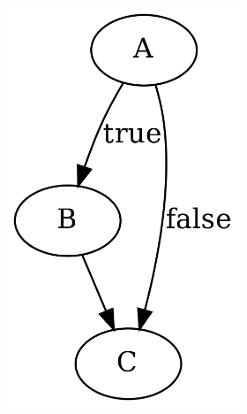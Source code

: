 \begin{savenotes}
	\begin{figure}[htbp]
		\centering
		\begin{subfigure}[ht]{0.23\textwidth}
			\centering
			\begin{subfigure}[ht]{0.45\textwidth}
				
			\end{subfigure}
			\begin{subfigure}[ht]{0.42\textwidth}
				\includegraphics[width=\textwidth]{inc/primitives/if.png}

\end{subfigure}
\end{subfigure}
\end{figure}
\end{savenotes}
